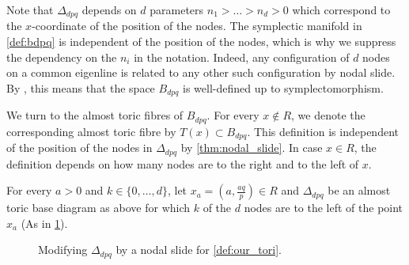 \documentclass[12pt,a4paper,draft]{scrartcl}
\begin{document}
Note that $\Delta_{dpq}$ depends on $d$ parameters $n_1>\ldots>n_d > 0$ which correspond to the $x$-coordinate of the position of the nodes.
The symplectic manifold in \cref{def:bdpq} is independent of the position of the nodes, which is why we suppress the dependency on the $n_i$ in the notation.
Indeed, any configuration of $d$ nodes on a common eigenline is related to any other such configuration by nodal slide.
By \cite[Theorem 8.10]{evans2021atfs}, this means that the space $B_{dpq}$ is well-defined up to symplectomorphism.

We turn to the almost toric fibres of $B_{dpq}$.
For every $x \notin R$, we denote the corresponding almost toric fibre by $T(x) \subset B_{dpq}$.
This definition is independent of the position of the nodes in $\Delta_{dpq}$ by \cref{thm:nodal_slide}.
In case $x \in R$, the definition depends on how many nodes are to the right and to the left of $x$.

For every $a > 0$ and $k \in \{0,\ldots,d\}$, let $x_a = \left( a,\frac{aq}{p} \right) \in R$ and $\Delta_{dpq}$ be an almost toric base diagram as above for which $k$ of the $d$ nodes are to the left of the point $x_a$ (As in \cref{fig:our_tori}).

\begin{figure}
  \centering
  \caption{Modifying $Δ_{dpq}$ by a nodal slide for \cref{def:our_tori}.}
  \label{fig:our_tori}
\end{figure}
\end{document}
